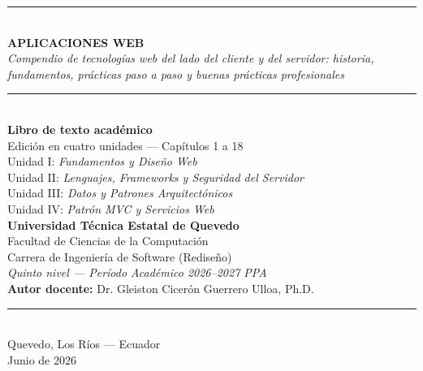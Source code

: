 \documentclass[11pt,a4paper,openany]{book}
\begin{document}
\frontmatter

\begin{titlepage}
\centering\vspace*{1cm}
{\color{uteqverde}\rule{\linewidth}{2pt}}\\[0.6cm]
{\Huge\bfseries\color{uteqverde} APLICACIONES WEB}\\[0.4cm]
{\Large\itshape Compendio de tecnologías web del lado del cliente y del servidor: historia, fundamentos, prácticas paso a paso y buenas prácticas profesionales}\\[0.3cm]
{\color{uteqverde}\rule{\linewidth}{1pt}}\\[1.2cm]
{\Large\bfseries Libro de texto académico}\\[0.3cm]
{\large Edición en cuatro unidades --- Capítulos 1 a 18}\\[0.5cm]
{\large Unidad I: \emph{Fundamentos y Diseño Web}}\\
{\large Unidad II: \emph{Lenguajes, Frameworks y Seguridad del Servidor}}\\
{\large Unidad III: \emph{Datos y Patrones Arquitectónicos}}\\
{\large Unidad IV: \emph{Patrón MVC y Servicios Web}}\\[1.6cm]
{\large\bfseries Universidad Técnica Estatal de Quevedo}\\
{\large Facultad de Ciencias de la Computación}\\
{\large Carrera de Ingeniería de Software (Rediseño)}\\[0.7cm]
{\large\itshape Quinto nivel --- Período Académico 2026--2027 PPA}\\[1.5cm]
{\large \textbf{Autor docente:} Dr. Gleiston Cicerón Guerrero Ulloa, Ph.D.}\\[1.8cm]
{\color{uteqdorado}\rule{\linewidth}{2pt}}\\[0.4cm]
{\large Quevedo, Los Ríos --- Ecuador}\\
{\large Junio de 2026}
\end{titlepage}
\end{document}
